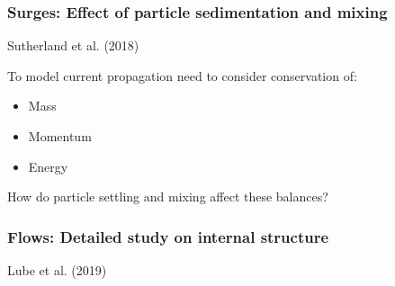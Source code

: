 \documentclass{beamer}
\begin{document}
\begin{frame}
  \frametitle{Surges: Effect of particle sedimentation and mixing}

  \begin{center}
    \footnotesize Sutherland et al. (2018)
  \end{center}

  To model current propagation need to consider conservation of:

  \begin{itemize}
  \item Mass \\
  \item Momentum \\
  \item Energy \\
  \end{itemize}

  How do particle settling and mixing affect these balances? \\
\end{frame}
\begin{frame}
  \frametitle{Flows: Detailed study on internal structure}

  \begin{center}
    \footnotesize Lube et al. (2019)
  \end{center}

\end{frame}
\end{document}
